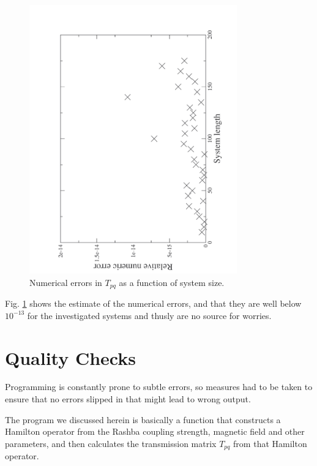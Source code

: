 \begin{figure}[htb]
    \begin{center}
    \includegraphics[angle=270,width=0.8\textwidth]{numeric-errors.pdf}
    \end{center}
    \caption{Numerical errors in $T_{pq}$ as a function of system size.}
    \label{fig:numeric-errors}
\end{figure}

Fig. \ref{fig:numeric-errors} shows the estimate of the numerical errors, and
that they are well below $10^{-13}$ for the investigated systems and
thusly are no source for worries.

\section{Quality Checks}

Programming is constantly prone to subtle errors, so measures had to 
be taken to ensure that no errors slipped in that might lead to wrong
output.

The program we discussed herein is basically a function that constructs a
Hamilton operator from the Rashba coupling strength, magnetic
field and other parameters, and then calculates the transmission
matrix $T_{pq}$ from that Hamilton operator.

